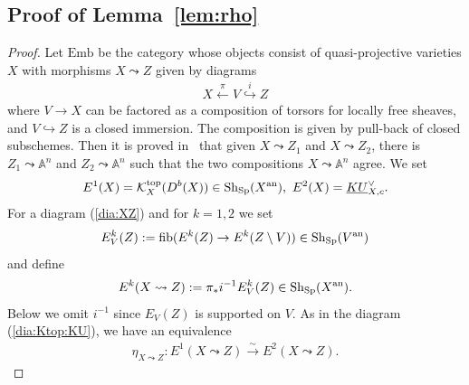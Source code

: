 \documentclass [11pt,oneside,a4paper,mathscr]{amsart}
\theoremstyle{definition}
\begin{document}
\subsection{Proof of Lemma~\ref{lem:rho}}\label{subsec:lem:rho}
\begin{proof} 
   Let $\mathrm{Emb}$ be the category whose objects consist of quasi-projective varieties $X$ with 
    morphisms $X \leadsto Z$ given by diagrams
    \begin{align}\label{dia:XZ}
X \stackrel{\pi}{\leftarrow} V \stackrel{i}{\hookrightarrow} Z
\end{align}
where $V\to X$ can be factored as a composition of torsors for locally free sheaves, and $V\hookrightarrow Z$ is a closed immersion. The composition is given by pull-back of closed subschemes. 
Then it is proved in~\cite{Thoma1, ThomasonAS} that given $X\leadsto Z_1$ and $X\leadsto Z_2$, there is 
$Z_1 \leadsto \mathbb{A}^n$ and $Z_2 \leadsto \mathbb{A}^n$ such that the two 
compositions $X\leadsto \mathbb{A}^n$ agree. 
We set 
\begin{align*}
    E^1(X)=\mathcal{K}_X^{\rm{top}}(D^b(X)) \in \mathrm{Sh}_{\mathrm{Sp}}(X^{\rm{an}}), \ 
    E^2(X)=\underline{KU}_{X, c}^{\vee}. 
\end{align*}
For a diagram (\ref{dia:XZ}) and for $k=1, 2$ we set 
\begin{align*}
    E^k_{V}(Z):=\mathrm{fib}(E^k(Z) \to E^k(Z \setminus V)) \in \mathrm{Sh}_{\mathrm{Sp}}(V^{\rm{an}})
\end{align*}
and define 
\begin{align*}
    E^k(X\leadsto Z):=\pi_{*}i^{-1}E_{V}^k(Z) \in \mathrm{Sh}_{\mathrm{Sp}}(X^{\rm{an}}).
\end{align*}
Below we omit $i^{-1}$ since $E_V(Z)$ is supported on $V$. 
As in the diagram (\ref{dia:Ktop:KU}), we have an equivalence 
\begin{align*}
    \eta_{X\leadsto Z} \colon E^1(X\leadsto Z) \stackrel{\sim}{\to} E^2(X\leadsto Z).
\end{align*}


\end{proof}
\end{document}
